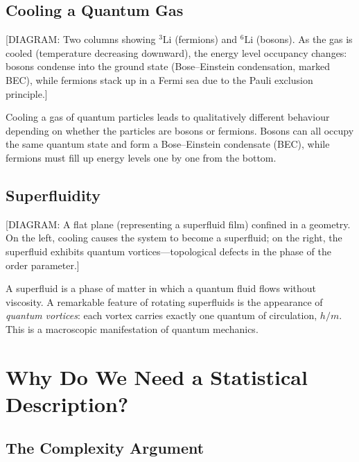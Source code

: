 \subsection{Cooling a Quantum Gas}

\begin{center}
[DIAGRAM: Two columns showing $^3\mathrm{Li}$ (fermions) and $^6\mathrm{Li}$ (bosons). As the gas
is cooled (temperature decreasing downward), the energy level occupancy changes: bosons
condense into the ground state (Bose--Einstein condensation, marked BEC), while fermions stack
up in a Fermi sea due to the Pauli exclusion principle.]
\end{center}

Cooling a gas of quantum particles leads to qualitatively different behaviour depending on
whether the particles are bosons or fermions. Bosons can all occupy the same quantum state and
form a Bose--Einstein condensate (BEC), while fermions must fill up energy levels one by one
from the bottom.

\subsection{Superfluidity}

\begin{center}
[DIAGRAM: A flat plane (representing a superfluid film) confined in a geometry. On the left,
cooling causes the system to become a superfluid; on the right, the superfluid exhibits
quantum vortices---topological defects in the phase of the order parameter.]
\end{center}

A superfluid is a phase of matter in which a quantum fluid flows without viscosity. A remarkable
feature of rotating superfluids is the appearance of \emph{quantum vortices}: each vortex
carries exactly one quantum of circulation, $h/m$. This is a macroscopic manifestation of
quantum mechanics.

\section{Why Do We Need a Statistical Description?}

\subsection{The Complexity Argument}

